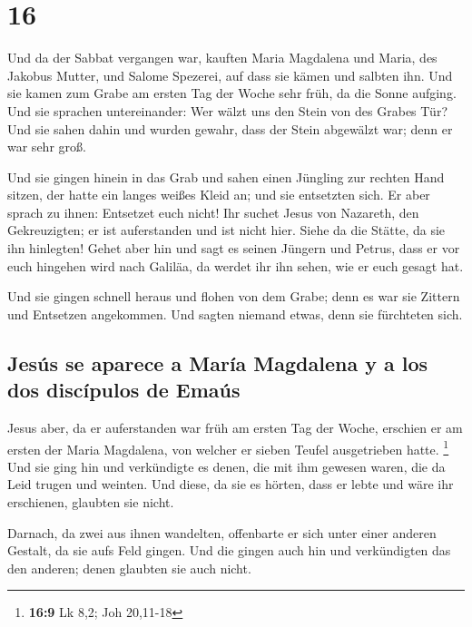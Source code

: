 \hypertarget{section-15}{%
\section{16}\label{section-15}}

 Und da der Sabbat vergangen war, kauften Maria Magdalena
und Maria, des Jakobus Mutter, und Salome Spezerei, auf dass sie kämen
und salbten ihn.  Und sie kamen zum Grabe am ersten Tag
der Woche sehr früh, da die Sonne aufging.  Und sie
sprachen untereinander: Wer wälzt uns den Stein von des Grabes Tür?
 Und sie sahen dahin und wurden gewahr, dass der Stein
abgewälzt war; denn er war sehr groß.

 Und sie gingen hinein in das Grab und sahen einen
Jüngling zur rechten Hand sitzen, der hatte ein langes weißes Kleid an;
und sie entsetzten sich.  Er aber sprach zu ihnen:
Entsetzet euch nicht! Ihr suchet Jesus von Nazareth, den Gekreuzigten;
er ist auferstanden und ist nicht hier. Siehe da die Stätte, da sie ihn
hinlegten!  Gehet aber hin und sagt es seinen Jüngern und
Petrus, dass er vor euch hingehen wird nach Galiläa, da werdet ihr ihn
sehen, wie er euch gesagt hat.

 Und sie gingen schnell heraus und flohen von dem Grabe;
denn es war sie Zittern und Entsetzen angekommen. Und sagten niemand
etwas, denn sie fürchteten sich.

\hypertarget{jesuxfas-se-aparece-a-maruxeda-magdalena-y-a-los-dos-discuxedpulos-de-emauxfas}{%
\subsection{Jesús se aparece a María Magdalena y a los dos discípulos de
Emaús}\label{jesuxfas-se-aparece-a-maruxeda-magdalena-y-a-los-dos-discuxedpulos-de-emauxfas}}

 Jesus aber, da er auferstanden war früh am ersten Tag der
Woche, erschien er am ersten der Maria Magdalena, von welcher er sieben
Teufel ausgetrieben hatte. \footnote{\textbf{16:9} Lk 8,2; Joh 20,11-18}
 Und sie ging hin und verkündigte es denen, die mit ihm
gewesen waren, die da Leid trugen und weinten.  Und
diese, da sie es hörten, dass er lebte und wäre ihr erschienen, glaubten
sie nicht.

 Darnach, da zwei aus ihnen wandelten, offenbarte er sich
unter einer anderen Gestalt, da sie aufs Feld gingen. 
Und die gingen auch hin und verkündigten das den anderen; denen glaubten
sie auch nicht.

